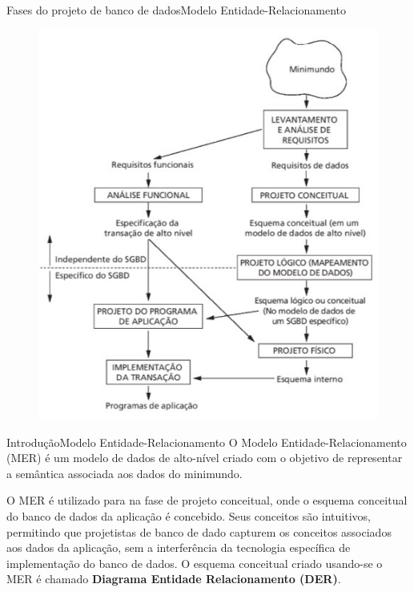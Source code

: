 \documentclass[t]{beamer}
\begin{document}


\begin{ftst}{Fases do projeto de banco de dados}{Modelo Entidade-Relacionamento}
\begin{figure}
    \centering
    \includegraphics[scale=0.5]{Figuras/01_1.jpg}
\end{figure}

\end{ftst}


\begin{ftst}{Introdução}{Modelo Entidade-Relacionamento}
\small
\vone
O Modelo Entidade-Relacionamento (MER) é um modelo de dados de alto-nível criado com o objetivo de representar a semântica associada aos dados do minimundo.

O MER é utilizado para na fase de projeto conceitual, onde o esquema conceitual do
banco de dados da aplicação é concebido.
\vone
Seus conceitos são intuitivos, permitindo que projetistas de banco de dado capturem os conceitos associados aos dados da aplicação, sem a interferência da tecnologia específica de implementação do banco de dados. 
\vone
O esquema conceitual criado usando-se o MER é chamado \textbf{Diagrama Entidade Relacionamento (DER)}.

\end{ftst}
\end{document}
